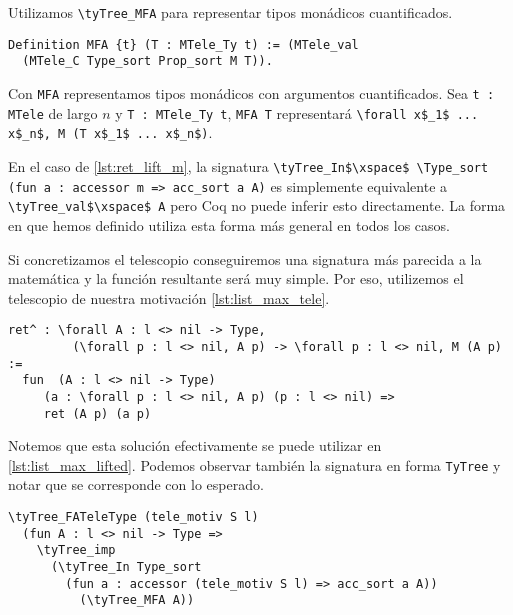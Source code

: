 Utilizamos \lstinline{\tyTree_MFA} para representar tipos monádicos cuantificados. %

\begin{lstlisting}[frame=tb,caption={Definición de \lstinline{MFA}},label=lst:mfa]
Definition MFA {t} (T : MTele_Ty t) := (MTele_val
  (MTele_C Type_sort Prop_sort M T)).
\end{lstlisting}

Con \lstinline{MFA} representamos tipos monádicos con argumentos cuantificados. 
Sea \lstinline{t : MTele} de largo $n$ y \lstinline{T : MTele_Ty t}, \lstinline{MFA T} representará \lstinline{\forall x$_1$ ... x$_n$, M (T x$_1$ ... x$_n$)}.

En el caso de \ref{lst:ret_lift_m}, la signatura \lstinline{\tyTree_In$\xspace$ \Type_sort (fun a : accessor m => acc_sort a A)} es simplemente equivalente a \lstinline{\tyTree_val$\xspace$ A} pero Coq no puede inferir esto directamente.
La forma en que hemos definido \lift utiliza esta forma más general en todos los casos.

Si concretizamos el telescopio conseguiremos una signatura más parecida a la matemática y la función resultante será muy simple. Por eso, utilizemos el telescopio de nuestra motivación \ref{lst:list_max_tele}.

\begin{lstlisting}[frame=tb,caption={Ejemplo de \lstinline{ret^}},label=lst:exmp_ret]
ret^ : \forall A : l <> nil -> Type,
         (\forall p : l <> nil, A p) -> \forall p : l <> nil, M (A p) :=
  fun  (A : l <> nil -> Type)
     (a : \forall p : l <> nil, A p) (p : l <> nil) => 
     ret (A p) (a p)
\end{lstlisting}

Notemos que esta solución efectivamente se puede utilizar en \ref{lst:list_max_lifted}. Podemos observar también la signatura en forma \lstinline{TyTree} y notar que se corresponde con lo esperado.

\begin{lstlisting}[frame=tb,caption={Signatura en \lstinline{TyTree} de \lstinline{ret^}},label=lst:exmp_ret_tytree]
\tyTree_FATeleType (tele_motiv S l)
  (fun A : l <> nil -> Type =>
    \tyTree_imp
      (\tyTree_In Type_sort
        (fun a : accessor (tele_motiv S l) => acc_sort a A))
          (\tyTree_MFA A))
\end{lstlisting}

